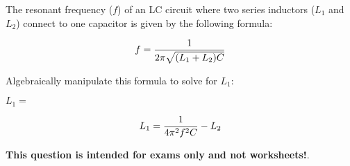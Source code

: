 

The resonant frequency ($f$) of an LC circuit where two series inductors ($L_1$ and $L_2$) connect to one capacitor is given by the following formula:

$$f = {1 \over {2 \pi \sqrt{(L_1 + L_2) C}}}$$

Algebraically manipulate this formula to solve for $L_1$:

\vskip 20pt

$L_1 = $







$$L_1 = {1 \over {4 \pi^2 f^2 C}} - L_2$$







{\bf This question is intended for exams only and not worksheets!}.



